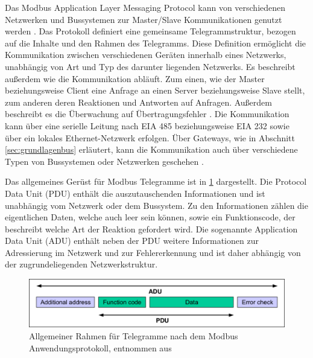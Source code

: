 Das Modbus Application Layer Messaging Protocol kann von verschiedenen Netzwerken und Bussystemen zur Master/Slave Kommunikationen genutzt werden \cite[S.~2f.]{mod12}.
Das Protokoll definiert eine gemeinsame Telegrammstruktur, bezogen auf die Inhalte und den Rahmen des Telegramms. Diese Definition ermöglicht die Kommunikation zwischen verschiedenen Geräten innerhalb eines Netzwerks, unabhängig von Art und Typ des darunter liegenden Netzwerks. Es beschreibt außerdem wie die Kommunikation abläuft. Zum einen, wie der Master beziehungsweise Client eine Anfrage an einen Server beziehungsweise Slave stellt, zum anderen deren Reaktionen und Antworten auf Anfragen. Außerdem beschreibt es die Überwachung auf Übertragungsfehler \cite[S.~2f.]{mod96}.
Die Kommunikation kann über eine serielle Leitung nach EIA 485 beziehungsweise EIA 232 sowie über ein lokales Ethernet-Netzwerk erfolgen. Über Gateways, wie in Abschnitt \ref{sec:grundlagenbus} erläutert, kann die Kommunikation auch über verschiedene Typen von Bussystemen oder Netzwerken geschehen \cite[S.~3f.]{mod12}.

Das allgemeines Gerüst für Modbus Telegramme ist in \ref{fig:modbusframe} dargestellt. Die Protocol Data Unit (PDU) enthält die auszutauschenden Informationen und ist unabhängig vom Netzwerk oder dem Bussystem. Zu den Informationen zählen die eigentlichen Daten, welche auch leer sein können, sowie ein Funktionscode, der beschreibt welche Art der Reaktion gefordert wird. Die sogenannte Application Data Unit (ADU) enthält neben der PDU weitere Informationen zur Adressierung im Netzwerk und zur Fehlererkennung und ist daher abhängig von der zugrundeliegenden Netzwerkstruktur.

\begin{figure}
\centering
\includegraphics[width=\textwidth]{abbildungen/20160319_Modbusframe}
\caption[Allgemeiner Rahmen für Telegramme nach dem Modbus Anwendungsprotokoll]{Allgemeiner Rahmen für Telegramme nach dem Modbus Anwendungsprotokoll, entnommen aus \cite[S.~3]{mod12}}
\label{fig:modbusframe}
\end{figure}

